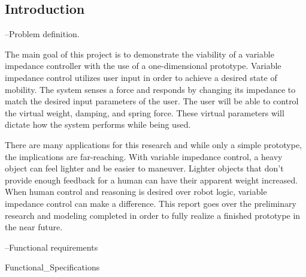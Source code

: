 \subsection*{Introduction}

\noindent --Problem definition. \par
The main goal of this project is to demonstrate the viability of a variable impedance controller with the use of a one-dimensional prototype. Variable impedance control utilizes user input in order to achieve a desired state of mobility. The system senses a force and responds by changing its impedance to match the desired input parameters of the user. The user will be able to control the virtual weight, damping, and spring force. These virtual parameters will dictate how the system performs while being used. \par
There are many applications for this research and while only a simple prototype, the implications are far-reaching. With variable impedance control, a heavy object can feel lighter and be easier to maneuver. Lighter objects that don't provide enough feedback for a human can have their apparent weight increased. When human control and reasoning is desired over robot logic, variable impedance control can make a difference. This report goes over the preliminary research and modeling completed in order to fully realize a finished prototype in the near future.

\noindent --Functional requirements \par
 {Functional_Specifications}
